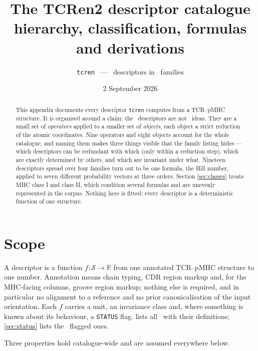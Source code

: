 \documentclass[11pt,a4paper]{article}
\title{\bfseries The TCRen2 descriptor catalogue\\[2pt]
\large hierarchy, classification, formulas and derivations}
\author{\normalsize \texttt{tcren} \tcrenVersion\ --- \nDesc\ descriptors in \nFamilies\ families}
\date{\normalsize 2 September 2026}
\begin{document}
\maketitle

\begin{abstract}
\noindent
This appendix documents every descriptor \texttt{tcren} computes from a TCR--pMHC structure. It is
organised around a claim: the \nDesc\ descriptors are not \nDesc\ ideas. They are a small set of
\emph{operators} applied to a smaller set of \emph{objects}, each object a strict reduction of the
atomic coordinates. Nine operators and eight objects account for the whole catalogue, and naming
them makes three things visible that the family listing hides --- which descriptors can be
redundant with which (only within a reduction step), which are exactly determined by others, and
which are invariant under what. Nineteen descriptors spread over four families turn out to be one
formula, the Hill number, applied to seven different probability vectors at three orders. Section
\ref{sec:classes} treats MHC class I and class II, which condition several formulas and are
unevenly represented in the corpus. Nothing here is fitted: every descriptor is a deterministic
function of one structure.
\end{abstract}

\tableofcontents

\section{Scope}

A descriptor is a function $f : \mathcal{S} \to \mathbb{R}$ from one annotated TCR--pMHC structure
to one number. Annotation means chain typing, CDR region markup and, for the MHC-facing columns,
groove region markup; nothing else is required, and in particular no alignment to a reference and
no prior canonicalisation of the input orientation. Each $f$ carries a unit, an invariance class
and, where something is known about its behaviour, a \texttt{STATUS} flag. 
lists all \nDesc\ with their definitions; \cref{sec:status} lists the \nFlagged\ flagged ones.

Three properties hold catalogue-wide and are assumed everywhere below.
\end{document}
